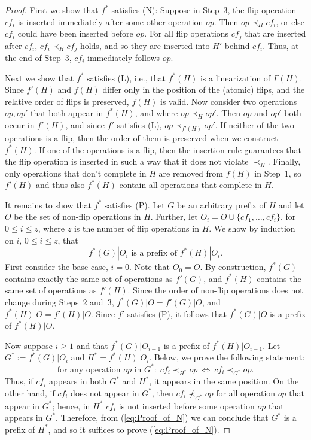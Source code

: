 \documentclass[11pt,letterpaper]{article}
\begin{document}
\begin{proof}
  First we show that $f^\ast$ satisfies (N):
  Suppose in Step~3, the flip operation $cf_i$ is inserted immediately after some other operation $op$.
  Then $op\prec_H cf_i$, or else $cf_i$ could have been inserted before $op$.
  For all flip operations $cf_j$ that are inserted after $cf_i$, $cf_i\prec_H cf_j$ holds, and so they are inserted into $H'$ behind $cf_i$.
  Thus, at the end of Step~3, $cf_i$ immediately follows $op$.

  Next we show that $f^\ast$ satisfies (L), i.e., that $f^\ast(H)$ is a linearization of $\Gamma(H)$.
  Since $f'(H)$ and $f(H)$ differ only in the position of the (atomic) flips, and the relative order of flips is preserved, $f(H)$ is valid.
  Now consider two operations $op,op'$ that both appear in $f^\ast(H)$, and where $op\prec_H op'$.
  Then $op$ and $op'$ both occur in $f'(H)$, and since $f'$ satisfies (L), $op\prec_{f'(H)} op'$.
  If neither of the two operations is a flip, then the order of them is preserved when we construct $f^\ast(H)$.
  If one of the operations is a flip, then the insertion rule guarantees that the flip operation is inserted in such a way
  that it does not violate $\prec_H$.
  Finally, only operations that don't complete in $H$ are removed from $f(H)$ in Step~1, so $f'(H)$ and thus also $f^\ast(H)$ contain all operations that complete in $H$.

  It remains to show that $f^\ast$ satisfies (P).
  Let $G$ be an arbitrary prefix of $H$ and let $O$ be the set of non-flip operations in $H$.
  Further, let $O_i=O\cup\{cf_1,\dots,cf_i\}$, for $0\leq i\leq z$, where $z$ is the number of flip operations in $H$.
  We show by induction on $i$, $0\leq i\leq z$, that
  \begin{displaymath}
    f^\ast(G)|{O_i}\text{ is a prefix of }f^\ast(H)|O_i.
  \end{displaymath}
  First consider the base case, $i=0$.
  Note that $O_0=O$.
  By construction, $f^\ast(G)$ contains exactly the same set of operations as $f'(G)$, and $f^\ast(H)$ contains the same set of operations as $f'(H)$.
  Since the order of non-flip operations does not change during Steps~2 and~3, $f^\ast(G)|{O}=f'(G)|O$, and $f^\ast(H)|{O}=f'(H)|O$.
  Since $f'$ satisfies (P), it follows that $f^\ast(G)|O$ is a prefix of $f^\ast(H)|{O}$.

  Now suppose $i\geq 1$ and that $f^\ast(G)|{O_{i-1}}$ is a prefix of $f^\ast(H)|O_{i-1}$.
  Let $G^\ast:=f^\ast(G)|O_i$ and $H^\ast=f^\ast(H)|O_i$.
  Below, we prove the following statement:
 \begin{equation}\label{eq:Proof_of_N}
  \text{for any operation $op$ in $G^\ast$:}\ \
    cf_i\prec_{H^\ast} op
    \ \Leftrightarrow\ cf_i\prec_{G^\ast} op.
  \end{equation}
  Thus, if $cf_i$ appears in both $G^\ast$ and $H^\ast$, it appears in the same position.
  On the other hand, if $cf_i$ does not appear in $G^\ast$, then $cf_i\not\prec_{G^\ast} op$ for all operation $op$ that appear in $G^\ast$; hence, in $H^\ast$ $cf_i$ is not inserted before some operation $op$ that appears in $G^\ast$.
  Therefore, from (\ref{eq:Proof_of_N}) we can conclude that $G^\ast$ is a prefix of $H^\ast$, and so it suffices to prove (\ref{eq:Proof_of_N}).


\end{proof}
\end{document}
